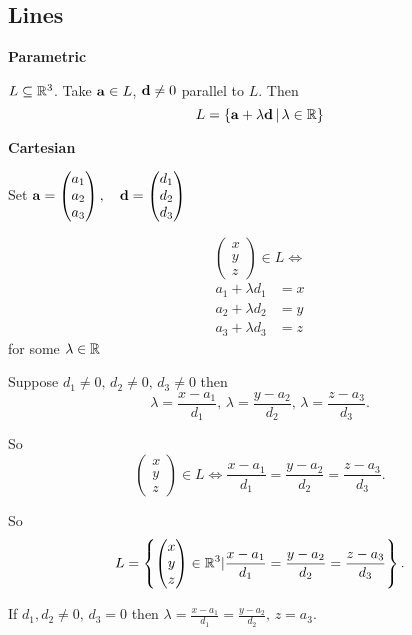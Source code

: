 \documentclass[10pt, a4paper]{article}
\begin{document}
\subsection{Lines}

\textbf{Parametric}

$L \subseteq \mathbb{R} ^ 3$. Take $\mathbf{a} \in L$, $\mathbf{d} \neq 0$ parallel to $L$. Then
\[
L = \{\mathbf{a} +\lambda\mathbf{d}\,|\, \lambda \in \mathbb{R}\}
\]

\textbf{Cartesian}

Set $\mathbf{a} = \begin{pmatrix}
    a_1 \\ a_2 \\ a_3
\end{pmatrix},\quad\mathbf{d} = \begin{pmatrix}
    d_1 \\ d_2 \\ d_3
\end{pmatrix}$


\[
\begin{pmatrix}
    x \\ y \\ z
\end{pmatrix} \in L \iff
\]
\begin{align*}
    a_1 + \lambda d_1 &= x \\
    a_2 + \lambda d_2 &= y \\
    a_3 + \lambda d_3 &= z
\end{align*}
for some $\lambda \in \mathbb{R}$

Suppose $d_1 \neq 0,\, d_2 \neq 0,\,d_3 \neq 0$ then
\[
\lambda = \frac{x - a_1}{d_1},\,\lambda = \frac{y - a_2}{d_2},\,\lambda = \frac{z - a_3}{d_3}.
\]

So
\[
\begin{pmatrix}
    x \\ y \\ z
\end{pmatrix} \in L \iff
\frac{x - a_1}{d_1} = \frac{y - a_2}{d_2} = \frac{z - a_3}{d_3}.
\]

So 
\[
L = \left\{\begin{pmatrix}
    x \\ y \\ z
\end{pmatrix} \in \mathbb{R} ^ 3 | \frac{x - a_1}{d_1} = \frac{y - a_2}{d_2} = \frac{z - a_3}{d_3}\right\}.
\]

If $d_1, d_2 \neq 0,\,d_3 = 0$ then $\lambda = \frac{x - a_1}{d_1} = \frac{y - a_2}{d_2},\, z = a_3$.
\end{document}
